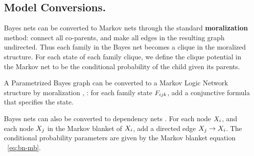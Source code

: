 \documentclass[twoside,leqno,twocolumn]{article}
\begin{document}
\subsection{Model Conversions.} \label{sec:conversions}
Bayes nets can be converted to Markov nets through the standard \textbf{moralization} method: connect all co-parents, and make all edges in the resulting graph undirected. Thus each family in the Bayes net becomes a clique in the moralized structure. For each state of each family clique, we define the clique potential in the Markov net to be the conditional probability of the child given its parents. 
%

A Parametrized Bayes graph can be converted to a Markov Logic Network structure by moralization \cite[12.5.3]{Domingos2007}, \cite{Schulte2012}: for each family state $F_{ijk}$, add a conjunctive formula that specifies the state.


Bayes nets can also be converted to dependency nets \cite{Heckerman2000}. For each node $X_{i}$, and each node  $X_{j}$ in the Markov blanket of $X_{i}$, add a directed edge $X_{j} \rightarrow X_{i}$. 
The conditional probability parameters are  given by the Markov blanket equation ~\eqref{eq:bn-mb}.
\end{document}
